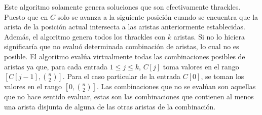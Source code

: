   Este algoritmo solamente genera soluciones que son efectivamente thrackles.
  Puesto que en $C$ solo se avanza a la siguiente posición
  cuando se encuentra que la arista de la posición actual intersecta a las
  aristas anteriormente establecidas. Además, el algoritmo genera todos los
  thrackles con $k$ aristas. Si no lo hiciera significaría que no evaluó
  determinada combinación de aristas, lo cual no es posible. El algoritmo
  evalúa virtualmente todas las combinaciones posibles de aristas ya que, para
  cada entrada $1\leq j\leq k$, $C[j]$ toma valores en el rango
  $\left[C[j-1],\binom{n}{2}\right]$. Para el caso particular de la entrada
  $C[0]$, se toman los valores en el rango $\left[ 0, \binom{n}{2}\right]$. Las
  combinaciones que no se evalúan son aquellas que no hace sentido evaluar,
  estas son las combinaciones que contienen al menos una arista disjunta de
  alguna de las otras aristas de la combinación.

